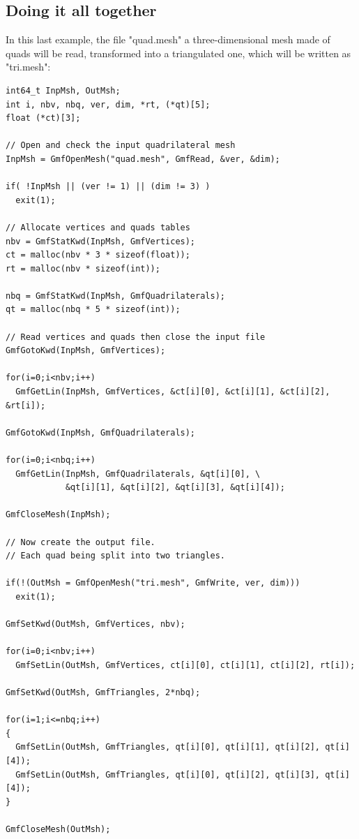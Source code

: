 \documentclass[a4paper,12pt]{article}
\begin{document}
\subsection{Doing it all together}

In this last example, the file "quad.mesh" a three-dimensional mesh made of quads will be read, transformed into a triangulated one, which will be written as "tri.mesh":

\begin{tt}
\begin{verbatim}
int64_t InpMsh, OutMsh;
int i, nbv, nbq, ver, dim, *rt, (*qt)[5];
float (*ct)[3];

// Open and check the input quadrilateral mesh
InpMsh = GmfOpenMesh("quad.mesh", GmfRead, &ver, &dim);

if( !InpMsh || (ver != 1) || (dim != 3) )
  exit(1);

// Allocate vertices and quads tables
nbv = GmfStatKwd(InpMsh, GmfVertices);
ct = malloc(nbv * 3 * sizeof(float));
rt = malloc(nbv * sizeof(int));

nbq = GmfStatKwd(InpMsh, GmfQuadrilaterals);
qt = malloc(nbq * 5 * sizeof(int));

// Read vertices and quads then close the input file
GmfGotoKwd(InpMsh, GmfVertices);

for(i=0;i<nbv;i++)
  GmfGetLin(InpMsh, GmfVertices, &ct[i][0], &ct[i][1], &ct[i][2], &rt[i]);

GmfGotoKwd(InpMsh, GmfQuadrilaterals);

for(i=0;i<nbq;i++)
  GmfGetLin(InpMsh, GmfQuadrilaterals, &qt[i][0], \
            &qt[i][1], &qt[i][2], &qt[i][3], &qt[i][4]);

GmfCloseMesh(InpMsh);

// Now create the output file.
// Each quad being split into two triangles.

if(!(OutMsh = GmfOpenMesh("tri.mesh", GmfWrite, ver, dim)))
  exit(1);

GmfSetKwd(OutMsh, GmfVertices, nbv);

for(i=0;i<nbv;i++)
  GmfSetLin(OutMsh, GmfVertices, ct[i][0], ct[i][1], ct[i][2], rt[i]);

GmfSetKwd(OutMsh, GmfTriangles, 2*nbq);

for(i=1;i<=nbq;i++)
{
  GmfSetLin(OutMsh, GmfTriangles, qt[i][0], qt[i][1], qt[i][2], qt[i][4]);
  GmfSetLin(OutMsh, GmfTriangles, qt[i][0], qt[i][2], qt[i][3], qt[i][4]);
}

GmfCloseMesh(OutMsh);
\end{verbatim}
\end{tt}
\normalfont
\end{document}
